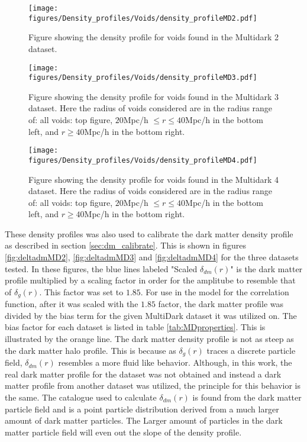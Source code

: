 \begin{figure}[H]
    \texttt{[image: figures/Density\_profiles/Voids/density\_profileMD2.pdf]}
    \caption{Figure showing the density profile for voids found in the Multidark 2 dataset.}
    \label{fig:deltaMD2}
\end{figure}
\begin{figure}[H]
    \texttt{[image: figures/Density\_profiles/Voids/density\_profileMD3.pdf]}
    \caption{Figure showing the density profile for voids found in the Multidark 3 dataset. Here the radius of voids considered are in the radius range of: all voids: top figure, $20$Mpc/h $\leq r\leq 40$Mpc/h in the bottom left, and $r\geq 40$Mpc/h in the bottom right.}
    \label{fig:deltaMD3}
\end{figure}
\begin{figure}[H]
    \texttt{[image: figures/Density\_profiles/Voids/density\_profileMD4.pdf]}
    \caption{Figure showing the density profile for voids found in the Multidark 4 dataset. Here the radius of voids considered are in the radius range of: all voids: top figure, $20$Mpc/h $\leq r\leq 40$Mpc/h in the bottom left, and $r\geq 40$Mpc/h in the bottom right.}
    \label{fig:deltaMD4}
\end{figure}
These density profiles was also used to calibrate the dark matter density profile as described in section \ref{sec:dm_calibrate}. This is shown in figures \ref{fig:deltadmMD2}, \ref{fig:deltadmMD3} and \ref{fig:deltadmMD4} for the three datasets tested.
In these figures, the blue lines labeled "Scaled $\delta_{dm}(r)$" is the dark matter profile multiplied by a scaling factor in order for the amplitube to resemble that of $\delta_g(r)$. This factor was set to $1.85$. For use in the model for the correlation function, after it was scaled with the $1.85$ factor, the dark matter profile was divided by the bias term for the given MultiDark dataset it was utilized on. The bias factor for each dataset is listed in table \ref{tab:MDproperties}. This is illustrated by the orange line.
The dark matter density profile is not as steep as the dark matter halo profile. This is because as $\delta_g(r)$ traces a discrete particle field, $\delta_{dm}(r)$ resembles a more fluid like behavior. Although, in this work, the real dark matter profile for the dataset was not obtained and instead a dark matter profile from another dataset was utilized, the principle for this behavior is the same. The catalogue used to calculate $\delta_{dm}(r)$ is found from the dark matter particle field and is a point particle distribution derived from a much larger amount of dark matter particles. The Larger amount of particles in the dark matter particle field will even out the slope of the density profile.\\\indent 
